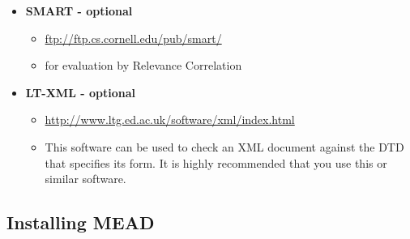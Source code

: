 \documentclass[10pt]{article}
\begin{document}
\begin{itemize}
\item {\bf SMART - optional}
\begin{itemize}
\item \url{ftp://ftp.cs.cornell.edu/pub/smart/}
\item for evaluation by Relevance Correlation
\end{itemize}

\item {\bf LT-XML - optional}
\begin{itemize}
\item \url{http://www.ltg.ed.ac.uk/software/xml/index.html}
\item This software can be used to check an XML document against
  the DTD that specifies its form.  It is highly recommended that you
  use this or similar software.
\end{itemize}

\end{itemize}

\subsection{Installing MEAD}
\end{document}
